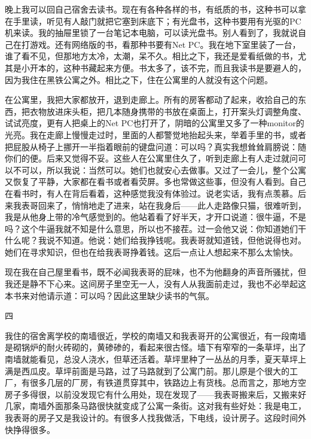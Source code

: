 晚上我可以回自己宿舍去读书。现在有各种各样的书，有纸质的书，这种书可以拿在手里读，听见有人敲门就把它塞到床底下；有光盘书，这种书要用有光驱的PC机来读。我的抽屉里锁了一台笔记本电脑，可以读光盘书。别人看到了，我就说自己在打游戏。还有网络版的书，看那种书要有Net PC。我在地下室里装了一台，谁了看不见，但那地方太冷，太潮，呆不久。相比之下，我还是爱看纸做的书，尤其是小开本的，这种书藏起来方便。书太多了，该不完，而且我读书是要避人的，因为我住在黑铁公寓之外。相比之下，住在公寓里的人就没有这个问题。 

在公寓里，我把大家都放开，退到走廊上。所有的房客都动了起来，收拾自己的东西，把衣物放进床头柜，把几本随身携带的书放在桌面上，打开案头灯调整角度、试试亮度，更有人把桌上的Net PC也打开了，阴暗的公寓里又多了一种monitor的光亮。我在走廊上慢慢走过时，里面的人都警觉地抬起头来，举着手里的书，或者把屁股从椅子上挪开一半指着眼前的键盘问道：可以吗？真实我想耸耸肩膀说：随你们的便。后来又觉得不妥。这些人在公寓里住久了，听到走廊上有人走过就问可以不可以，所以我说：当然可以。她们也就安心去做事。又过了一会儿，整个公寓又恢复了平静，大家都在看书或者看荧屏。多也常做这些事，但没有人看到。自己在看书时，有人在背后看着，这种感觉我没有体验过。说老实话，我有点羡慕。后来我表哥回来了，悄悄地走了进来，站在我身后——此人走路像只猫，很难听到，我是从他身上带的冷气感觉到的。他站着看了好半天，才开口说道：很牛逼，不是吗？这个牛逼我就不知是什么意思，所以也不接茬。过一会他又说：你知道她们干什么呢？我说不知道。他说：她们给我挣钱呢。我表哥就知道钱，但他说得也对。她们在寻求知识，但也在给我表哥挣着钱。这后一点让人想起来不那么太愉快。 

现在我在自己屋里看书，既不必闻我表哥的屁味，也不为他翻身的声音所骚扰，但我还是静不下心来。这间房子里空无一人，没有人从我面前走过，我也不必举起这本书来对他请示道：可以吗？因此这里缺少读书的气氛。 



四 

我住的宿舍离学校的南墙很近，学校的南墙又和我表哥开的公寓很近，有一段南墙是砌锅炉的耐火砖砌的，黄碜碜的，看起来很古怪。墙下有窄窄的一条草坪，出了南墙就能看见，总没人浇水，但草还活着。草坪里种了一丛丛的月季，夏天草坪上满是西瓜皮。草坪前面是马路，过了马路就到了公寓门前。那儿原是个很大的工厂，有很多几层的厂房，有铁道贯穿其中，铁路边上有货栈。总而言之，那地方空房子多得很，以前没发现它有什么用处，现在发现了——我表哥搬来后，又搬来好几家，南墙外面那条马路很快就变成了公寓一条街。这对我有些好处：我是电工，我表哥的房子又是我设计的。有很多人找我做活，下电线，设计房子。这段时间外快挣得很多。 



